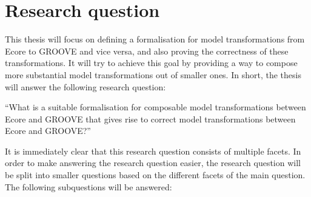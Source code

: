 \section{Research question}
\label{sec:introduction:research_question}
This thesis will focus on defining a formalisation for model transformations from Ecore to GROOVE and vice versa, and also proving the correctness of these transformations. It will try to achieve this goal by providing a way to compose more substantial model transformations out of smaller ones. In short, the thesis will answer the following research question:

``What is a suitable formalisation for composable model transformations between Ecore and GROOVE that gives rise to correct model transformations between Ecore and GROOVE?''

It is immediately clear that this research question consists of multiple facets. In order to make answering the research question easier, the research question will be split into smaller questions based on the different facets of the main question. The following subquestions will be answered:
